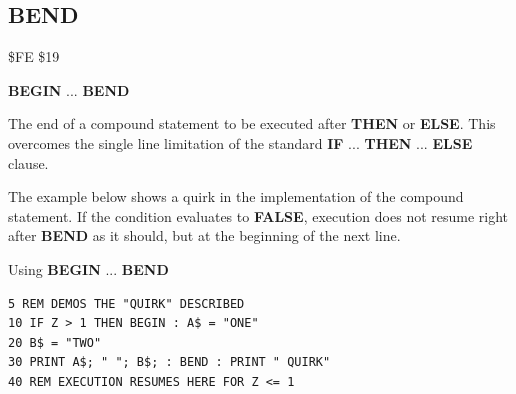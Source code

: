 \subsection{BEND}
\begin{description}[leftmargin=2cm,style=nextline]
\item [Token:]   \$FE \$19

\item [Format:]  {\bf BEGIN} ... {\bf BEND}

\item [Usage:]   The end of a compound statement to be executed after {\bf THEN} or {\bf ELSE}. This overcomes the single line limitation of the standard {\bf IF} ... {\bf THEN} ... {\bf ELSE} clause.

\item [Remarks:] The example below shows a quirk in the implementation of the compound statement. If the condition evaluates to {\bf FALSE}, execution does not resume right after {\bf BEND} as it should, but at the beginning of the next line.

\item [Example:] Using {\bf BEGIN} ... {\bf BEND}

\begin{tcolorbox}[colback=black,coltext=white]
\verbatimfont{\codefont}
\begin{verbatim}
5 REM DEMOS THE "QUIRK" DESCRIBED
10 IF Z > 1 THEN BEGIN : A$ = "ONE"
20 B$ = "TWO"
30 PRINT A$; " "; B$; : BEND : PRINT " QUIRK"
40 REM EXECUTION RESUMES HERE FOR Z <= 1
\end{verbatim}
\end{tcolorbox}
\end{description}


\newpage

